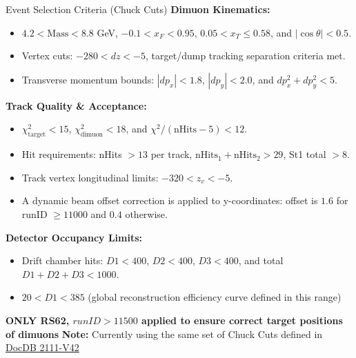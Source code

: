 \documentclass[aspectratio=169]{beamer}
\begin{document}
\begin{frame}{Event Selection Criteria (Chuck Cuts)}
\textbf{Dimuon Kinematics:}
\begin{itemize}
    \item $4.2 < \text{Mass} < 8.8$ GeV, $-0.1 < x_F < 0.95$, $0.05 < x_T \le 0.58$, and $|\cos\theta| < 0.5$.
    \item Vertex cuts: $-280 < dz < -5$, target/dump tracking separation criteria met.
    \item Transverse momentum bounds: $|dp_x| < 1.8$, $|dp_y| < 2.0$, and $dp_x^2 + dp_y^2 < 5$.
\end{itemize}
\vspace{0.1cm}
\textbf{Track Quality \& Acceptance:}
\begin{itemize}
    \item $\chi^2_{\text{target}} < 15$, $\chi^2_{\text{dimuon}} < 18$, and $\chi^2/(\text{nHits}-5) < 12$.
    \item Hit requirements: nHits $> 13$ per track, $\text{nHits}_1+\text{nHits}_2 > 29$, St1 total $> 8$.
    \item Track vertex longitudinal limits: $-320 < z_v < -5$.
    \item A dynamic beam offset correction is applied to y-coordinates: offset is $1.6$ for runID $\ge 11000$ and $0.4$ otherwise.
\end{itemize}
\vspace{0.1cm}
\textbf{Detector Occupancy Limits:}
\begin{itemize}
    \item Drift chamber hits: $D1 < 400$, $D2 < 400$, $D3 < 400$, and total $D1+D2+D3 < 1000$.
    \item $20 < D1 < 385$ (global reconstruction efficiency curve defined in this range)
\end{itemize}
\textbf{ONLY RS62,  $runID > 11500$ applied to ensure correct target positions of dimuons}
\vspace{0.1cm}
\textbf{Note:} Currently using the same set of Chuck Cuts defined in \href{https://seaquest-docdb.fnal.gov/cgi-bin/sso/ShowDocument?docid=2111}{DocDB 2111-V42}
\end{frame}
\end{document}

